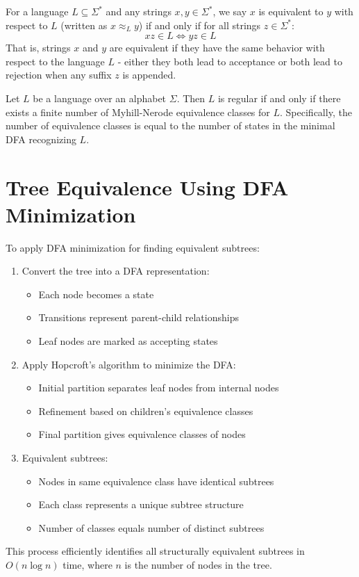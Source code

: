 \begin{definition}
    For a language $L \subseteq \Sigma^*$ and any strings $x,y \in \Sigma^*$, we say $x$ is equivalent to $y$ with respect to $L$ (written as $x \approx_L y$) if and only if for all strings $z \in \Sigma^*$:
    \[ xz \in L \Leftrightarrow yz \in L \]
    That is, strings $x$ and $y$ are equivalent if they have the same behavior with respect to the language $L$ - either they both lead to acceptance or both lead to rejection when any suffix $z$ is appended.
\end{definition}

\begin{theorem} \label{def:myhill-nerode}
    Let $L$ be a language over an alphabet $\Sigma$. Then $L$ is regular if and only if there exists a finite number of Myhill-Nerode equivalence classes for $L$. Specifically, the number of equivalence classes is equal to the number of states in the minimal DFA recognizing $L$.
\end{theorem}

\section{Tree Equivalence Using DFA Minimization}
To apply DFA minimization for finding equivalent subtrees:

\begin{enumerate}
    \item Convert the tree into a DFA representation:
    \begin{itemize}
        \item Each node becomes a state
        \item Transitions represent parent-child relationships
        \item Leaf nodes are marked as accepting states
    \end{itemize}

    \item Apply Hopcroft's algorithm to minimize the DFA:
    \begin{itemize}
        \item Initial partition separates leaf nodes from internal nodes
        \item Refinement based on children's equivalence classes
        \item Final partition gives equivalence classes of nodes
    \end{itemize}

    \item Equivalent subtrees:
    \begin{itemize}
        \item Nodes in same equivalence class have identical subtrees
        \item Each class represents a unique subtree structure
        \item Number of classes equals number of distinct subtrees
    \end{itemize}
\end{enumerate}

This process efficiently identifies all structurally equivalent subtrees in $O(n \log n)$ time, where $n$ is the number of nodes in the tree.
